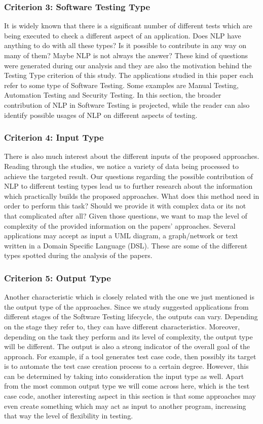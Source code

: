 \subsubsection* {Criterion 3: Software Testing Type}
It is widely known that there is a significant number of different tests which are being executed to check a different aspect of an application. Does NLP have anything to do with all these types? Is it possible to 
contribute in any way on many of them? Maybe NLP is not always the answer? These kind of questions were generated during our analysis and they are also the motivation behind the Testing Type criterion of this study. 
The applications studied in this paper each refer to some type of Software Testing. Some examples are Manual Testing, Automation Testing and Security Testing. 
In this section, the broader contribution of NLP in Software Testing is projected, while the reader can also identify possible usages of NLP on different aspects of testing.

\subsubsection* {Criterion 4: Input Type}
There is also much interest about the different inputs of the proposed approaches. Reading through the studies, we notice a variety of data  
being processed to achieve the targeted result. Our questions regarding the possible contribution of NLP to different testing types lead us to further research about the information which practically builds 
the proposed approaches. What does this method need in order to perform this task? Should we provide it with complex data or its not that complicated after all? Given those questions, we want to map the level of 
complexity of the provided information on the papers' approaches. Several applications may accept as input a UML 
diagram, a graph/network or text written in a Domain Specific Language (DSL). These are some of the different types spotted during the analysis of the papers.

\subsubsection* {Criterion 5: Output Type}
Another characteristic which is closely related with the one we just mentioned is the output type of the approaches. Since we study suggested applications 
from different stages of the Software Testing lifecycle, the outputs can vary. Depending on the stage they refer to, they can have different characteristics. Moreover, depending on the task they perform and its 
level of complexity, the output type will be different. The output is also a strong indicator of the overall goal of the approach. For example, if a tool generates test case code, then possibly its target is to 
automate the test case creation process to a certain degree. However, this can be determined by taking into consideration the input type as well. Apart from the most common output type we will come across here, which is the 
test case code, another interesting aspect in this section is that some approaches may even create something which may act as input to another program, increasing that way the level of flexibility in testing.


